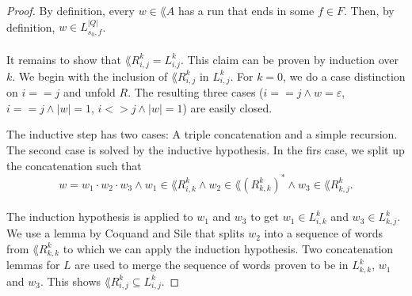 \documentclass[11pt,a4paper,oneside]{book}
\begin{document}
                    \begin{proof}
                        By definition, every $w \in \lang{A}$ has a run that ends in some $f \in F$. 
                        Then, by definition, $w \in  L^{|Q|}_{s_0, f}$. 

                    \paragraph{}
                        It remains to show that $\lang{R^k_{i,j}} = L^k_{i.j}$. 
                        This claim can be proven by induction over $k$. 
                        We begin with the inclusion of $\lang{R^k_{i,j}}$ in $L^k_{i,j}$. 
                        For $k=0$, we do a case distinction on $i==j$ and unfold $R$. 
                        The resulting three cases ($i==j \wedge w=\varepsilon$, $i==j \wedge |w|=1$, $i<>j \wedge |w|=1$) are easily closed. 

                        The inductive step has two cases: A triple concatenation and a simple recursion. 
                        The second case is solved by the inductive hypothesis.
                        In the firs case, we split up the concatenation such that
                        \[
                            w = w_1 \cdot w_2 \cdot w_3 
                            \wedge w_1 \in \lang{R^k_{i,k}} 
                            \wedge w_2 \in \lang{(R^k_{k,k})^*} 
                            \wedge w_3 \in \lang{R^k_{k,j}}.
                        \]
                    \paragraph{}
                        The induction hypothesis is applied to $w_1$ and $w_3$ to get $w_1 \in L^k_{i,k}$ and $w_3 \in L^k_{k,j}$.
                        We use a lemma by Coquand and Sile that splits $w_2$ into a sequence of words from $\lang{R^k_{k,k}}$ to which we can apply the induction hypothesis. 
                        Two concatenation lemmas for $L$ are used to merge the sequence of words proven to be in $L^k_{k,k}$,
                        $w_1$ and $w_3$. This shows $\lang{R^k_{i,j}} \subseteq L^k_{i,j}$.


\end{proof}
\end{document}
